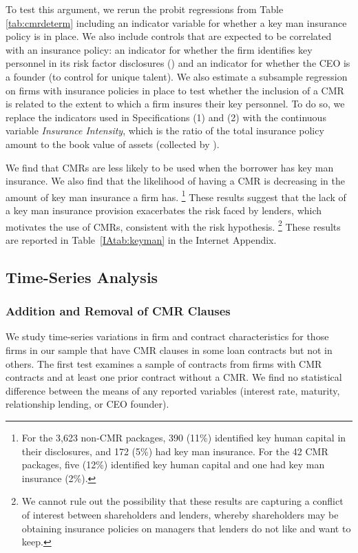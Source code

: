 \documentclass[a4paper,12pt]{article}
\begin{document}
To test this argument, we rerun the probit regressions from Table \ref{tab:cmrdeterm} including an indicator variable for whether a key man insurance policy is in place.
We also include controls that are expected to be correlated with an insurance policy: an indicator for whether the firm identifies key personnel in its risk factor disclosures (\citet{Israelsen_2017}) and an indicator for whether the CEO is a founder (to control for unique talent).
We also estimate a subsample regression on firms with insurance policies in place to test whether the inclusion of a CMR is related to the extent to which a firm insures their key personnel.
To do so, we replace the indicators used in Specifications (1) and (2) with the continuous variable \textit{Insurance Intensity}, which is the ratio of the total insurance policy amount to the book value of assets (collected by \citet{Israelsen_2017}).


We find that CMRs are less likely to be used when the borrower has key man insurance.
We also find that the likelihood of having a CMR is decreasing in the amount of key man insurance a firm has.%
    \footnote{For the 3,623 non-CMR packages, 390 (11\%) identified key human capital in their disclosures, and 172 (5\%) had key man insurance. For the 42 CMR packages, five (12\%) identified key human capital and one had key man insurance (2\%).}
These results suggest that the lack of a key man insurance provision exacerbates the risk faced by lenders, which motivates the use of CMRs, consistent with the risk hypothesis.%
 \footnote{We cannot rule out the possibility that these results are capturing a conflict of interest between shareholders and lenders, whereby shareholders may be obtaining insurance policies on managers that lenders do not like and want to keep.}
These results are reported in Table~\ref{IAtab:keyman} in the Internet Appendix.




\subsection{Time-Series Analysis}

\subsubsection{Addition and Removal of CMR Clauses}

We study time-series variations in firm and contract characteristics for those firms in our sample that have CMR clauses in some loan contracts but not in others.
The first test examines a sample of contracts from firms with CMR contracts and at least one prior contract without a CMR.
We find no statistical difference between the means of any reported variables (interest rate, maturity, relationship lending, or CEO founder).
\end{document}
